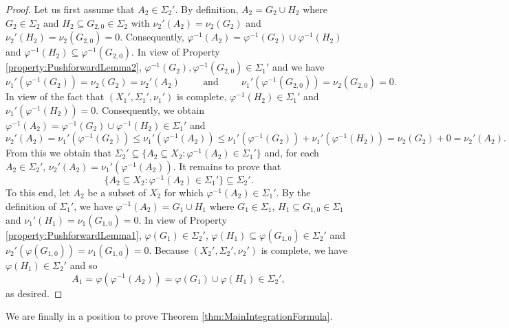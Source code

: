 \documentclass[11pt]{article}
\theoremstyle{remark}
\begin{document}
\begin{proof}
Let us first assume that $A_2\in\Sigma_2'$. By definition, $A_2=G_2\cup H_2$ where $G_2\in\Sigma_2$ and $H_2\subseteq G_{2,0}\in \Sigma_2$ with $\nu_2'(A_2)=\nu_2(G_2)$ and $\nu_2'(H_2)=\nu_2(G_{2,0})=0$. Consequently, $\varphi^{-1}(A_2)=\varphi^{-1}(G_2)\cup\varphi^{-1}(H_2)$ and $\varphi^{-1}(H_2)\subseteq \varphi^{-1}(G_{2,0})$. In view of Property \ref{property:PushforwardLemma2}, $\varphi^{-1}(G_2),\varphi^{-1}(G_{2,0})\in \Sigma_1'$ and we have
\begin{equation*}
\nu_1'(\varphi^{-1}(G_2))=\nu_2(G_2)=\nu_2'(A_2)\hspace{1cm}\mbox{and}\hspace{1cm}\nu_1'(\varphi^{-1}(G_{2,0}))=\nu_2(G_{2,0})=0.
\end{equation*}
In view of the fact that $(X_1',\Sigma_1',\nu_1')$ is complete, $\varphi^{-1}(H_2)\in\Sigma_1'$ and $\nu_1'(\varphi^{-1}(H_2))=0$. Consequently, we obtain $\varphi^{-1}(A_2)=\varphi^{-1}(G_2)\cup\varphi^{-1}(H_2)\in\Sigma_1'$ and
\begin{equation*}
\nu_2'(A_2)=\nu_1'(\varphi^{-1}(G_2))\leq\nu_1'(\varphi^{-1}(A_2))\leq\nu_1'(\varphi^{-1}(G_2))+\nu_1'(\varphi^{-1}(H_2))=\nu_2(G_2)+0=\nu_2'(A_2).
\end{equation*}
From this we obtain that $\Sigma_2'\subseteq \{A_2\subseteq X_2:\varphi^{-1}(A_2)\in\Sigma_1'\}$ and, for each $A_2\in\Sigma_2'$, $\nu_2'(A_2)=\nu_1'(\varphi^{-1}(A_2))$. It remains to prove that
\begin{equation*}
\{A_2\subseteq X_2:\varphi^{-1}(A_2)\in\Sigma_1'\}\subseteq \Sigma_2'.
\end{equation*}
To this end, let $A_2$ be a subset of $X_2$ for which $\varphi^{-1}(A_2)\in\Sigma_1'$. By the definition of $\Sigma_1'$, we have $\varphi^{-1}(A_2)=G_1\cup H_1$ where $G_1\in\Sigma_1$, $H_1\subseteq G_{1,0}\in\Sigma_1$ and $\nu_1'(H_1)=\nu_1(G_{1,0})=0$. In view of Property \ref{property:PushforwardLemma1}, $\varphi(G_1)\in\Sigma_2'$, $\varphi(H_1)\subseteq\varphi(G_{1,0})\in\Sigma_2'$ and $\nu_2'(\varphi(G_{1,0}))=\nu_1(G_{1,0})=0$. Because $(X_2',\Sigma_2',\nu_2')$ is complete, we have $\varphi(H_1)\in\Sigma_2'$ and so
\begin{equation*}
A_1=\varphi(\varphi^{-1}(A_2))=\varphi(G_1)\cup\varphi(H_1)\in \Sigma_2',
\end{equation*}
as desired.
\end{proof}

\noindent We are finally in a position to prove Theorem \ref{thm:MainIntegrationFormula}.
\end{document}
